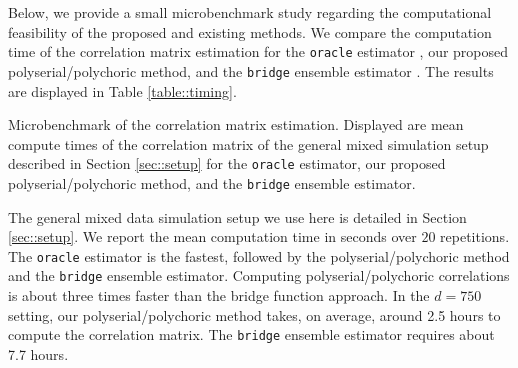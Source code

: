 \begin{change}
    Below, we provide a small microbenchmark study regarding the computational feasibility of the proposed and existing methods. We compare the computation time of the correlation matrix estimation for the \texttt{oracle} estimator \cite{Liu12}, our proposed polyserial/polychoric method, and the \texttt{bridge} ensemble estimator \cite{Feng19}. The results are displayed in Table \ref{table::timing}.

    \begin{table}[htbp!]
        \caption{Microbenchmark of the correlation matrix estimation. Displayed are mean compute times of the correlation matrix of the general mixed simulation setup described in Section \ref{sec::setup} for the \texttt{oracle} estimator, our proposed polyserial/polychoric method, and the \texttt{bridge} ensemble estimator.}

        \begin{center}
            
        \end{center}
        \label{table::timing}
    \end{table}

    The general mixed data simulation setup we use here is detailed in Section \ref{sec::setup}. We report the mean computation time in seconds over \(20\) repetitions. The \texttt{oracle} estimator is the fastest, followed by the polyserial/polychoric method and the \texttt{bridge} ensemble estimator. Computing polyserial/polychoric correlations is about three times faster than the bridge function approach. In the \(d=750\) setting, our polyserial/polychoric method takes, on average, around 2.5 hours to compute the correlation matrix. The \texttt{bridge} ensemble estimator requires about 7.7 hours.
\end{change}